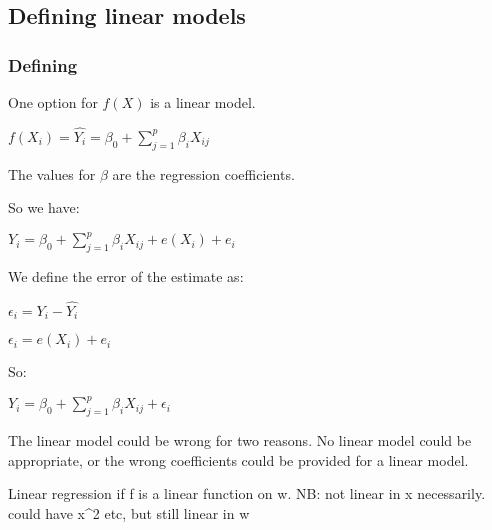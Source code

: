 
\subsection{Defining linear models}

\subsubsection{Defining}

One option for \(f(X)\) is a linear model.

$f(X_i)=\hat{Y_i}= \beta_0+\sum_{j=1}^p\beta_iX_{ij}$

The values for \(\beta \) are the regression coefficients.

So we have:

$Y_i=\beta_0+\sum_{j=1}^p\beta_iX_{ij}+e(X_i)+e_i$

We define the error of the estimate as:

$\epsilon_i=Y_i-\hat{Y_i}$

$\epsilon_i=e(X_i)+e_i $

So:

$Y_i=\beta_0+\sum_{j=1}^p\beta_iX_{ij}+\epsilon_i$

The linear model could be wrong for two reasons. No linear model could be appropriate, or the wrong coefficients could be provided for a linear model.

Linear regression if f is a linear function on w. NB: not linear in x necessarily. could have x^2 etc, but still linear in w

